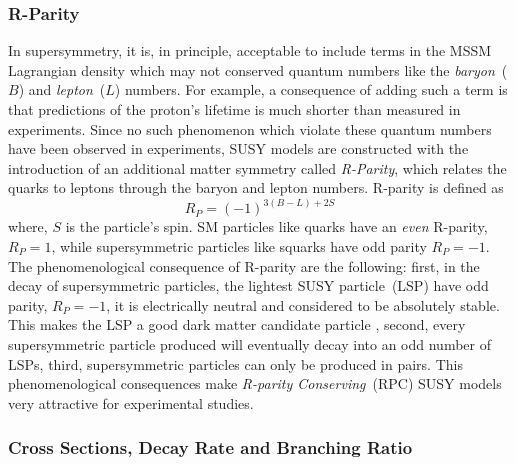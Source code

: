 \subsubsection{R-Parity}
In supersymmetry, it is, in principle, acceptable to include terms in the MSSM Lagrangian density which may not conserved quantum numbers like the \textit{baryon}~($B$) and \textit{lepton}~($L$) numbers. For example, a consequence of adding such a term is that predictions of the proton's lifetime is much shorter than measured in experiments. Since no such phenomenon which violate these quantum numbers have been observed in experiments, SUSY models are constructed with the introduction of an additional matter symmetry called \textit{R-Parity}, which relates the quarks to leptons through the baryon and lepton numbers. R-parity is defined as
\begin{equation}
R_{P} = \left(-1\right)^{3(B-L) + 2S}
\end{equation}
where, $S$ is the particle's spin.
SM particles like quarks have an \textit{even} R-parity, $R_{P} = 1$, while supersymmetric particles like squarks have odd parity $R_{P} = -1$.
\newline
The phenomenological consequence of R-parity are the following: first, in the decay of supersymmetric particles, the lightest SUSY particle~(LSP) have odd parity, $R_{P} =-1$, it is electrically neutral and considered to be absolutely stable. This makes the LSP a good dark matter candidate particle \cite{SUSYDM,KOlive}, second, every supersymmetric particle produced will eventually decay into an odd number of LSPs, third, supersymmetric particles can only be produced in pairs.
This phenomenological consequences make \textit{R-parity Conserving}~(RPC) SUSY models very attractive for experimental studies. 

\subsubsection{Cross Sections, Decay Rate and Branching Ratio}\label{LHCSUSY}
